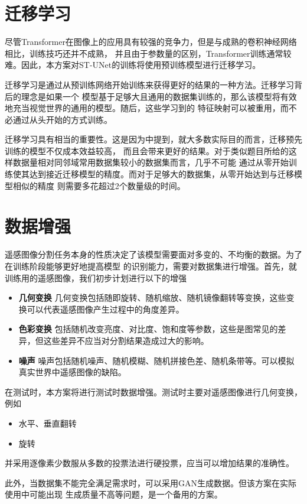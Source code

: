\documentclass[a4paper,twoside,zihao=5,UTF8]{ctexrep}
\begin{document}
\section{迁移学习}

尽管Transformer在图像上的应用具有较强的竞争力，但是与成熟的卷积神经网络相比，训练技巧还并不成熟\cite{howtotrain}，
并且由于参数量的区别，Transformer训练通常较难。因此，本方案对ST-UNet的训练将使用预训练模型进行迁移学习。

迁移学习是通过从预训练网络开始训练来获得更好的结果的一种方法。迁移学习背后的理念是如果一个
模型基于足够大且通用的数据集训练的，那么该模型将有效地充当视觉世界的通用的模型。随后，这些学习到的
特征映射可以被重用，而不必通过从头开始的方式训练。

迁移学习具有相当的重要性。这是因为\cite{howtotrain}中提到，就大多数实际目的而言，迁移预先训练的模型不仅成本效益较高，
而且会带来更好的结果。对于类似题目所给的这样数据量相对同邻域常用数据集较小的数据集而言，几乎不可能
通过从零开始训练使其达到接近迁移模型的精度。而对于足够大的数据集，从零开始达到与迁移模型相似的精度
则需要多花超过2个数量级的时间。


\section{数据增强}

遥感图像分割任务本身的性质决定了该模型需要面对多变的、不均衡的数据。为了在训练阶段能够更好地提高模型
的识别能力，需要对数据集进行增强。首先，就训练用的遥感图像，我们初步计划进行以下的增强
\begin{itemize}
    \item \textbf{几何变换} 几何变换包括随即旋转、随机缩放、随机镜像翻转等变换，这些变换可以代表遥感图像产生过程中的角度差异。
    \item \textbf{色彩变换} 包括随机改变亮度、对比度、饱和度等参数，这些是图常见的差异，但这些差异不应当对分割结果造成过大的影响。
    \item \textbf{噪声} 噪声包括随机噪声、随机模糊、随机拼接色差、随机条带等。可以模拟真实世界中遥感图像的缺陷。
\end{itemize}
在测试时，本方案将进行测试时数据增强。测试时主要对遥感图像进行几何变换，例如
\begin{itemize}
    \item 水平、垂直翻转
    \item 旋转
\end{itemize}
并采用逐像素少数服从多数的投票法进行硬投票，应当可以增加结果的准确性。

此外，当数据集不能完全满足需求时，可以采用GAN\cite{ganaug}生成数据。但该方案在实际使用中可能出现
生成质量不高等问题，是一个备用的方案。
\end{document}
